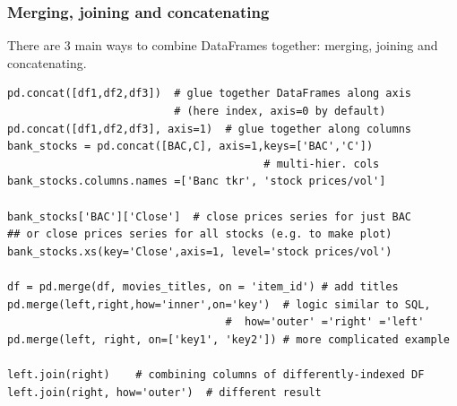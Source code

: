 \documentclass[11pt]{article}
\begin{document}
\subsubsection{Merging, joining and concatenating}
There are 3 main ways to combine DataFrames together: merging, joining and concatenating.
\begin{lstlisting}
pd.concat([df1,df2,df3])  # glue together DataFrames along axis 
                          # (here index, axis=0 by default)
pd.concat([df1,df2,df3], axis=1)  # glue together along columns
bank_stocks = pd.concat([BAC,C], axis=1,keys=['BAC','C']) 
									    # multi-hier. cols
bank_stocks.columns.names =['Banc tkr', 'stock prices/vol']

bank_stocks['BAC']['Close']  # close prices series for just BAC
## or close prices series for all stocks (e.g. to make plot)
bank_stocks.xs(key='Close',axis=1, level='stock prices/vol') 

df = pd.merge(df, movies_titles, on = 'item_id') # add titles
pd.merge(left,right,how='inner',on='key')  # logic similar to SQL, 
                                  #  how='outer' ='right' ='left'
pd.merge(left, right, on=['key1', 'key2']) # more complicated example

left.join(right)    # combining columns of differently-indexed DF
left.join(right, how='outer')  # different result
\end{lstlisting}
\end{document}
